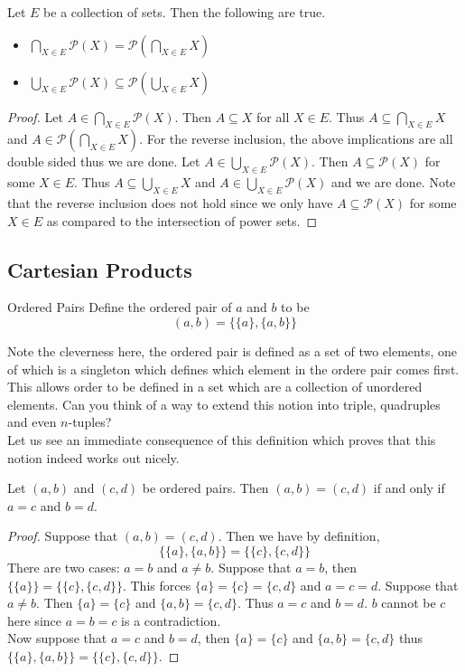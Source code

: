 \documentclass[a4paper]{article}
\begin{document}
\begin{prp}{}{} Let $E$ be a collection of sets. Then the following are true. 
\begin{itemize}
\item $\bigcap_{X\in E}\mathcal{P}(X)=\mathcal{P}(\bigcap_{X\in E}X)$
\item $\bigcup_{X\in E}\mathcal{P}(X)\subseteq\mathcal{P}(\bigcup_{X\in E}X)$
\end{itemize}
\begin{proof}
Let $A\in\bigcap_{X\in E}\mathcal{P}(X)$. Then $A\subseteq X$ for all $X\in E$. Thus $A\subseteq\bigcap_{X\in E}X$ and $A\in\mathcal{P}(\bigcap_{X\in E}X)$. For the reverse inclusion, the above implications are all double sided thus we are done. \linebreak\linebreak
Let $A\in\bigcup_{X\in E}\mathcal{P}(X)$. Then $A\subseteq\mathcal{P}(X)$ for some $X\in E$. Thus $A\subseteq\bigcup_{X\in E}X$ and $A\in\bigcup_{X\in E}\mathcal{P}(X)$ and we are done. Note that the reverse inclusion does not hold since we only have $A\subseteq\mathcal{P}(X)$ for some $X\in E$ as compared to the intersection of power sets. 
\end{proof}
\end{prp}

\subsection{Cartesian Products}
\begin{defn}{Ordered Pairs}{} Define the ordered pair of $a$ and $b$ to be $$(a,b)=\{\{a\},\{a,b\}\}$$
\end{defn}

Note the cleverness here, the ordered pair is defined as a set of two elements, one of which is a singleton which defines which element in the ordere pair comes first. This allows order to be defined in a set which are a collection of unordered elements. Can you think of a way to extend this notion into triple, quadruples and even $n$-tuples?\\

Let us see an immediate consequence of this definition which proves that this notion indeed works out nicely. 

\begin{prp}{}{} Let $(a,b)$ and $(c,d)$ be ordered pairs. Then $(a,b)=(c,d)$ if and only if $a=c$ and $b=d$. 
\begin{proof} Suppose that $(a,b)=(c,d)$. Then we have by definition, $$\{\{a\},\{a,b\}\}=\{\{c\},\{c,d\}\}$$ There are two cases: $a=b$ and $a\neq b$. Suppose that $a=b$, then $\{\{a\}\}=\{\{c\},\{c,d\}\}$. This forces $\{a\}=\{c\}=\{c,d\}$ and $a=c=d$. Suppose that $a\neq b$. Then $\{a\}=\{c\}$ and $\{a,b\}=\{c,d\}$. Thus $a=c$ and $b=d$. $b$ cannot be $c$ here since $a=b=c$ is a contradiction. \\

Now suppose that $a=c$ and $b=d$, then $\{a\}=\{c\}$ and $\{a,b\}=\{c,d\}$ thus $\{\{a\},\{a,b\}\}=\{\{c\},\{c,d\}\}$. 
\end{proof}
\end{prp}
\end{document}
